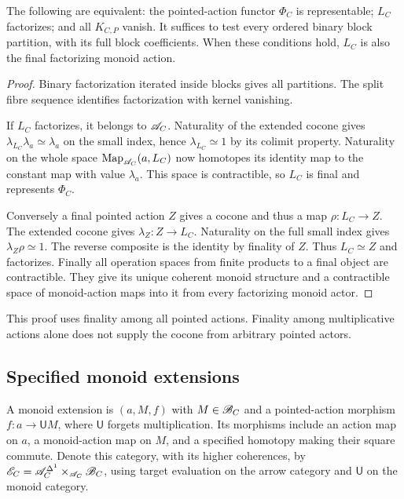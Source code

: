 \begin{theorem}\label{thm:vol2-density-criterion}
The following are equivalent: the pointed-action functor
$\Phi_C$ is representable; $L_C$ factorizes; and all
$K_{C,P}$ vanish. It suffices to test every ordered binary
block partition, with its full block coefficients.
When these conditions hold, $L_C$ is also the final
factorizing monoid action.
\end{theorem}
\begin{proof}
Binary factorization iterated inside blocks gives all
partitions. The split fibre sequence identifies
factorization with kernel vanishing.

If $L_C$ factorizes, it belongs to $\mathscr A_C$. Naturality of
the extended cocone gives
$\lambda_{L_C}\lambda_a\simeq\lambda_a$ on the small
index, hence $\lambda_{L_C}\simeq1$ by its colimit
property. Naturality on the whole space
$\operatorname{Map}_{\mathscr A_C}(a,L_C)$ now homotopes its identity map
to the constant map with value $\lambda_a$. This space
is contractible, so $L_C$ is final and represents $\Phi_C$.

Conversely a final pointed action $Z$ gives a cocone
and thus a map $\rho:L_C\to Z$. The extended cocone
gives $\lambda_Z:Z\to L_C$. Naturality on the full
small index gives $\lambda_Z\rho\simeq1$. The reverse
composite is the identity by finality of $Z$. Thus
$L_C\simeq Z$ and factorizes. Finally all operation
spaces from finite products to a final object are
contractible. They give its unique coherent monoid
structure and a contractible space of monoid-action
maps into it from every factorizing monoid actor.
\end{proof}

This proof uses finality among all pointed actions.
Finality among multiplicative actions alone does not
supply the cocone from arbitrary pointed actors.

\subsection{Specified monoid extensions}

A monoid extension is $(a,M,f)$ with $M\in\mathscr B_C$ and
a pointed-action morphism $f:a\to\mathsf U M$, where
$\mathsf U$ forgets multiplication. Its morphisms include
an action map on $a$, a monoid-action map on $M$, and
a specified homotopy making their square commute.
Denote this category, with its higher coherences, by
$\mathscr E_C=\mathscr A_C^{\Delta^1}\times_{\mathscr A_C}\mathscr B_C$,
using target evaluation on the arrow category and $\mathsf U$
on the monoid category.

